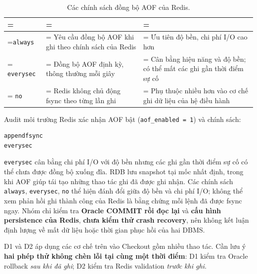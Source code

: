 \begin{table}[H]
\centering
\caption{Các chính sách đồng bộ AOF của Redis.}\label{tab:tx-8}
\reporttablesetup
\footnotesize
\begin{tabularx}{\linewidth}{|>{\hsize\linewidth=\hsize}L|>{\hsize\linewidth=\hsize}L|>{\hsize\linewidth=\hsize}L|}
\hline
{}
 &  &  \\ \hline
\texttt{always} & Yêu cầu đồng bộ AOF khi ghi theo chính sách của Redis & Ưu tiên độ bền, chi phí I/O cao hơn \\ \hline
\texttt{everysec} & Đồng bộ AOF định kỳ, thông thường mỗi giây & Cân bằng hiệu năng và độ bền; có thể mất các ghi gần thời điểm sự cố \\ \hline
\texttt{no} & Redis không chủ động fsync theo từng lần ghi & Phụ thuộc nhiều hơn vào cơ chế ghi dữ liệu của hệ điều hành \\ \hline
\end{tabularx}
\end{table}
Audit môi trường Redis xác nhận AOF bật (\texttt{aof\_\allowbreak{}enabled =\allowbreak{} 1}) và chính sách:

\begingroup
{}\label{result:tx-16}
\nopagebreak[4]
\begin{Verbatim}
appendfsync
everysec
\end{Verbatim}
\endgroup\par\smallskip
\texttt{everysec} cân bằng chi phí I/O với độ bền nhưng các ghi gần thời điểm sự cố có thể chưa được đồng bộ xuống đĩa. RDB lưu snapshot tại mốc nhất định, trong khi AOF giúp tái tạo những thao tác ghi đã được ghi nhận. Các chính sách \texttt{always}, \texttt{everysec}, \texttt{no} thể hiện đánh đổi giữa độ bền và chi phí I/O; không thể xem phản hồi ghi thành công của Redis là bằng chứng mỗi lệnh đã được fsync ngay. Nhóm chỉ kiểm tra \textbf{Oracle COMMIT rồi đọc lại} và \textbf{cấu hình persistence của Redis}, \textbf{chưa kiểm thử crash recovery}, nên không kết luận định lượng về mất dữ liệu hoặc thời gian phục hồi của hai DBMS.

\label{sec:tx-2-5}
D1 và D2 áp dụng các cơ chế trên vào Checkout gồm nhiều thao tác. Cần lưu ý \textbf{hai phép thử không chèn lỗi tại cùng một thời điểm}: D1 kiểm tra Oracle rollback \emph{sau khi đã ghi}; D2 kiểm tra Redis validation \emph{trước khi ghi}.

